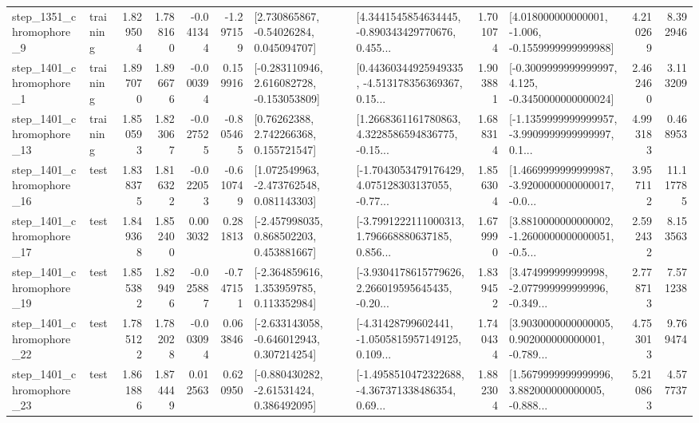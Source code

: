 \begin{tabular}{llrrrrllrlrr}
  step\_1351\_chromophore\_9 &  training &      1.829504 &    1.788160 &     -0.041344 & -1.297159 &     [2.730865867, -0.54026284, 0.045094707] &  [4.3441545854634445, -0.890343429770676, 0.455... &       1.701074 &   [4.018000000000001, -1.006, -0.1559999999999988] &            4.210269 &          8.392946 \\
  step\_1401\_chromophore\_1 &  training &      1.897070 &    1.896676 &     -0.000394 &  0.159916 &   [-0.283110946, 2.616082728, -0.153053809] &  [0.44360344925949335, -4.513178356369367, 0.15... &       1.903881 &  [-0.3009999999999997, 4.125, -0.3450000000000024] &            2.462460 &          3.113209 \\
 step\_1401\_chromophore\_13 &  training &      1.850593 &    1.823067 &     -0.027525 & -0.805465 &      [0.76262388, 2.742266368, 0.155721547] &  [1.2668361161780863, 4.3228586594836775, -0.15... &       1.688314 &  [-1.1359999999999957, -3.9909999999999997, 0.1... &            4.993183 &          0.468953 \\
 step\_1401\_chromophore\_16 &      test &      1.838375 &    1.816322 &     -0.022053 & -0.610749 &    [1.072549963, -2.473762548, 0.081143303] &  [-1.7043053479176429, 4.075128303137055, -0.77... &       1.856304 &  [1.4669999999999987, -3.9200000000000017, -0.0... &            3.957112 &         11.117785 \\
 step\_1401\_chromophore\_17 &      test &      1.849368 &    1.852400 &      0.003032 &  0.281813 &    [-2.457998035, 0.868502203, 0.453881667] &  [-3.7991222111000313, 1.796668880637185, 0.856... &       1.679990 &  [3.8810000000000002, -1.2600000000000051, -0.5... &            2.592432 &          8.153563 \\
 step\_1401\_chromophore\_19 &      test &      1.855382 &    1.829496 &     -0.025887 & -0.747151 &    [-2.364859616, 1.353959785, 0.113352984] &  [-3.9304178615779626, 2.266019595645435, -0.20... &       1.839452 &  [3.474999999999998, -2.077999999999996, -0.349... &            2.778713 &          7.571238 \\
 step\_1401\_chromophore\_22 &      test &      1.785122 &    1.782028 &     -0.003094 &  0.063846 &   [-2.633143058, -0.646012943, 0.307214254] &  [-4.31428799602441, -1.0505815957149125, 0.109... &       1.740434 &  [3.9030000000000005, 0.902000000000001, -0.789... &            4.753013 &          9.769474 \\
 step\_1401\_chromophore\_23 &      test &      1.861886 &    1.874449 &      0.012563 &  0.620950 &    [-0.880430282, -2.61531424, 0.386492095] &  [-1.4958510472322688, -4.367371338486354, 0.69... &       1.882304 &  [1.5679999999999996, 3.882000000000005, -0.888... &            5.210863 &          4.577737 \\

\end{tabular}
